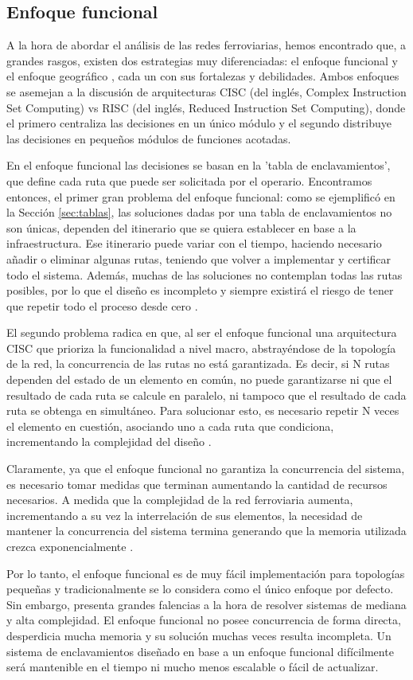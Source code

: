 \subsection{Enfoque funcional}

    A la hora de abordar el análisis de las redes ferroviarias, hemos encontrado que, a grandes rasgos, existen dos estrategias muy diferenciadas: el enfoque funcional y el enfoque geográfico \cite{Paper_9,Paper_204}, cada un con sus fortalezas y debilidades. Ambos enfoques se asemejan a la discusión de arquitecturas CISC (del inglés, Complex Instruction Set Computing) vs RISC (del inglés, Reduced Instruction Set Computing), donde el primero centraliza las decisiones en un único módulo y el segundo distribuye las decisiones en pequeños módulos de funciones acotadas.    

    En el enfoque funcional las decisiones se basan en la 'tabla de enclavamientos', que define cada ruta que puede ser solicitada por el operario. Encontramos entonces, el primer gran problema del enfoque funcional: como se ejemplificó en la Sección \ref{sec:tablas}, las soluciones dadas por una tabla de enclavamientos no son únicas, dependen del itinerario que se quiera establecer en base a la infraestructura. Ese itinerario puede variar con el tiempo, haciendo necesario añadir o eliminar algunas rutas, teniendo que volver a implementar y certificar todo el sistema. Además, muchas de las soluciones no contemplan todas las rutas posibles, por lo que el diseño es incompleto y siempre existirá el riesgo de tener que repetir todo el proceso desde cero \cite{Paper_204}.

    El segundo problema radica en que, al ser el enfoque funcional una arquitectura CISC que prioriza la funcionalidad a nivel macro, abstrayéndose de la topología de la red, la concurrencia de las rutas no está garantizada. Es decir, si N rutas dependen del estado de un elemento en común, no puede garantizarse ni que el resultado de cada ruta se calcule en paralelo, ni tampoco que el resultado de cada ruta se obtenga en simultáneo. Para solucionar esto, es necesario repetir N veces el elemento en cuestión, asociando uno a cada ruta que condiciona, incrementando la complejidad del diseño \cite{Paper_204}. 
    
    Claramente, ya que el enfoque funcional no garantiza la concurrencia del sistema, es necesario tomar medidas que terminan aumentando la cantidad de recursos necesarios. A medida que la complejidad de la red ferroviaria aumenta, incrementando a su vez la interrelación de sus elementos, la necesidad de mantener la concurrencia del sistema termina generando que la memoria utilizada crezca exponencialmente \cite{Paper_204}.

    Por lo tanto, el enfoque funcional es de muy fácil implementación para topologías pequeñas y tradicionalmente se lo considera como el único enfoque por defecto. Sin embargo, presenta grandes falencias a la hora de resolver sistemas de mediana y alta complejidad. El enfoque funcional no posee concurrencia de forma directa, desperdicia mucha memoria y su solución muchas veces resulta incompleta. Un sistema de enclavamientos diseñado en base a un enfoque funcional difícilmente será mantenible en el tiempo ni mucho menos escalable o fácil de actualizar.